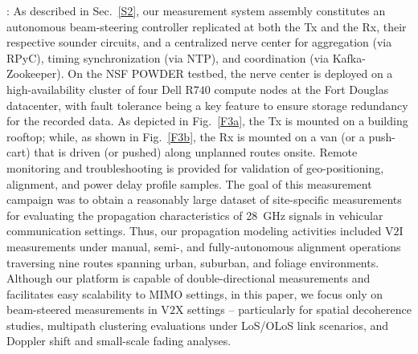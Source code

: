 \documentclass[12pt, draftcls, onecolumn]{IEEEtran}
\begin{document}
: As described in Sec.~\ref{S2}, our measurement system assembly constitutes an autonomous beam-steering controller replicated at both the Tx and the Rx, their respective sounder circuits, and a centralized nerve center for aggregation (via RPyC), timing synchronization (via NTP), and coordination (via Kafka-Zookeeper). On the NSF POWDER testbed, the nerve center is deployed on a high-availability cluster of four Dell R$740$ compute nodes at the Fort Douglas datacenter, with fault tolerance being a key feature to ensure storage redundancy for the recorded data. As depicted in Fig.~\ref{F3a}, the Tx is mounted on a building rooftop; while, as shown in Fig.~\ref{F3b}, the Rx is mounted on a van (or a push-cart) that is driven (or pushed) along unplanned routes onsite. Remote monitoring and troubleshooting is provided for validation of geo-positioning, alignment, and power delay profile samples. The goal of this measurement campaign was to obtain a reasonably large dataset of site-specific measurements for evaluating the propagation characteristics of \SI{28}{\giga\hertz} signals in vehicular communication settings. Thus, our propagation modeling activities included V$2$I measurements under manual, semi-, and fully-autonomous alignment operations traversing nine routes spanning urban, suburban, and foliage environments. Although our platform is capable of double-directional measurements and facilitates easy scalability to MIMO settings, in this paper, we focus only on beam-steered measurements in V$2$X settings -- particularly for spatial decoherence studies, multipath clustering evaluations under LoS/OLoS link scenarios, and Doppler shift and small-scale fading analyses.
\end{document}
